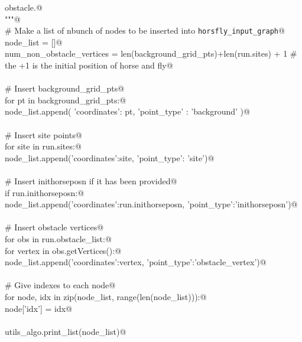 \documentclass[11.5pt]{report}
\begin{document}
\begin{flushleft}
\begin{minipage}{\linewidth}
\begin{list}{}{}
\mbox{}\verb@      obstacle.@\\
\mbox{}\verb@    """@\\
\mbox{}\verb@    # Make a list of nbunch of nodes to be inserted into \verb|horsfly_input_graph|@\\
\mbox{}\verb@    node_list = []@\\
\mbox{}\verb@    num_non_obstacle_vertices = len(background_grid_pts)+len(run.sites) + 1 # the +1 is the initial position of horse and fly@\\
\mbox{}\verb@@\\
\mbox{}\verb@    # Insert background_grid_pts@\\
\mbox{}\verb@    for pt in background_grid_pts:@\\
\mbox{}\verb@        node_list.append( {'coordinates': pt, 'point_type' : 'background'} )@\\
\mbox{}\verb@@\\
\mbox{}\verb@    # Insert site points@\\
\mbox{}\verb@    for site in run.sites:@\\
\mbox{}\verb@        node_list.append({'coordinates':site, 'point_type': 'site'})@\\
\mbox{}\verb@@\\
\mbox{}\verb@    # Insert inithorseposn if it has been provided@\\
\mbox{}\verb@    if run.inithorseposn:@\\
\mbox{}\verb@         node_list.append({'coordinates':run.inithorseposn, 'point_type':'inithorseposn'})@\\
\mbox{}\verb@@\\
\mbox{}\verb@    # Insert obstacle vertices@\\
\mbox{}\verb@    for obs in run.obstacle_list:@\\
\mbox{}\verb@         for vertex in obs.getVertices():@\\
\mbox{}\verb@             node_list.append({'coordinates':vertex, 'point_type':'obstacle_vertex'})@\\
\mbox{}\verb@@\\
\mbox{}\verb@    # Give indexes to each node@\\
\mbox{}\verb@    for node, idx in zip(node_list, range(len(node_list))):@\\
\mbox{}\verb@         node['idx'] = idx@\\
\mbox{}\verb@@\\
\mbox{}\verb@    utils_algo.print_list(node_list)@\\

\end{list}
\end{minipage}
\end{flushleft}
\end{document}
